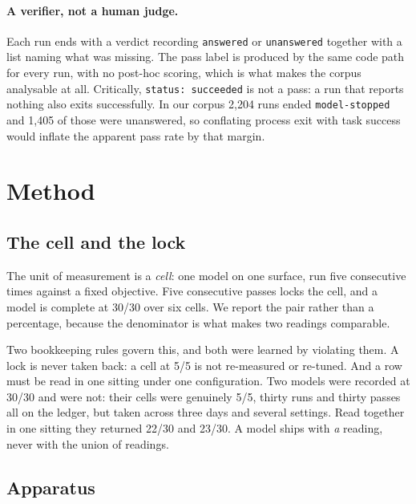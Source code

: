 \documentclass[11pt]{article}
\newcommand{\code}[1]{\texttt{\small #1}}
\begin{document}
\paragraph{A verifier, not a human judge.} Each run ends with a verdict recording \code{answered} or
\code{unanswered} together with a list naming what was missing. The pass label is produced by the same code path
for every run, with no post-hoc scoring, which is what makes the corpus analysable at all. Critically,
\code{status: succeeded} is not a pass: a run that reports nothing also exits successfully. In our corpus 2{,}204
runs ended \code{model-stopped} and 1{,}405 of those were unanswered, so conflating process exit with task
success would inflate the apparent pass rate by that margin.

\section{Method}

\subsection{The cell and the lock}

The unit of measurement is a \emph{cell}: one model on one surface, run five consecutive times against a fixed
objective. Five consecutive passes locks the cell, and a model is complete at 30/30 over six cells. We report the
pair rather than a percentage, because the denominator is what makes two readings comparable.

Two bookkeeping rules govern this, and both were learned by violating them. A lock is never taken back: a cell at
5/5 is not re-measured or re-tuned. And a row must be read in one sitting under one configuration. Two models
were recorded at 30/30 and were not: their cells were genuinely 5/5, thirty runs and thirty passes all on the
ledger, but taken across three days and several settings. Read together in one sitting they returned 22/30 and
23/30. A model ships with \emph{a} reading, never with the union of readings.

\subsection{Apparatus}
\end{document}
